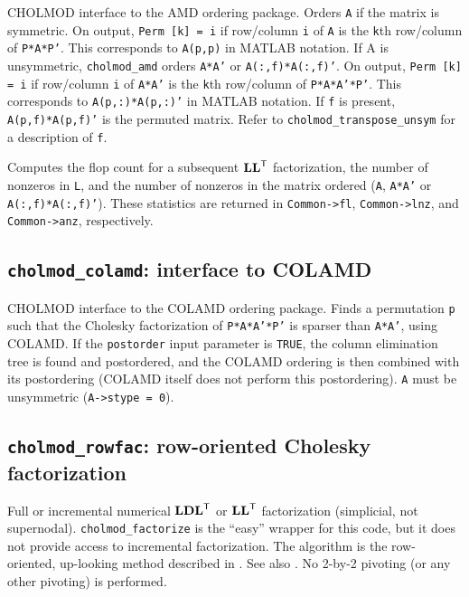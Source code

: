 \documentclass[11pt]{article}
\newcommand{\m}[1]{{\bf{#1}}}       %
\newcommand{\tr}{^{\sf T}}          %
\begin{document}

CHOLMOD interface to the AMD ordering package.  Orders {\tt A} if the matrix is
symmetric.  On output, {\tt Perm [k] = i} if row/column {\tt i} of {\tt A} is the {\tt k}th
row/column of {\tt P*A*P'}.  This corresponds to {\tt A(p,p)} in MATLAB notation.
If A is unsymmetric, {\tt cholmod\_amd} orders {\tt A*A'} or {\tt A(:,f)*A(:,f)'}.
On output, {\tt Perm [k] = i} if
row/column {\tt i} of {\tt A*A'} is the {\tt k}th row/column of {\tt P*A*A'*P'}.
This corresponds to {\tt A(p,:)*A(p,:)'} in MATLAB notation.
If {\tt f} is present, {\tt A(p,f)*A(p,f)'} is the permuted matrix.
Refer to {\tt cholmod\_transpose\_unsym} for a description of {\tt f}.

Computes the flop count for a subsequent $\m{LL}\tr$ factorization, the number
of nonzeros in {\tt L}, and the number of nonzeros in the matrix ordered
({\tt A}, {\tt A*A'} or {\tt A(:,f)*A(:,f)'}).
These statistics are returned in
{\tt Common->fl}, {\tt Common->lnz}, and {\tt Common->anz}, respectively.

\subsection{{\tt cholmod\_colamd}: interface to COLAMD}


CHOLMOD interface to the COLAMD ordering package.
Finds a permutation {\tt p} such that the Cholesky factorization of {\tt P*A*A'*P'} is
sparser than {\tt A*A'}, using COLAMD.  If the {\tt postorder} input parameter is {\tt TRUE},
the column elimination tree is found and postordered, and the COLAMD ordering is then
combined with its postordering (COLAMD itself does not perform this postordering).
{\tt A} must be unsymmetric ({\tt A->stype = 0}).

\subsection{{\tt cholmod\_rowfac}: row-oriented Cholesky factorization}


Full or incremental numerical $\m{LDL}\tr$ or $\m{LL}\tr$ factorization (simplicial, not
supernodal).  {\tt cholmod\_factorize} is the ``easy'' wrapper for this code, but it
does not provide access to incremental factorization.
The algorithm is the row-oriented, up-looking method described in \cite{Davis05}.
See also \cite{Liu86c}.  No 2-by-2 pivoting (or any other pivoting) is performed.
\end{document}
